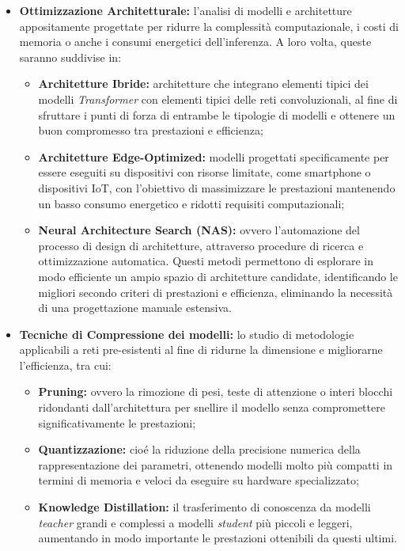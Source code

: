 \begin{itemize}
    \item \textbf{Ottimizzazione Architetturale:} l'analisi di modelli e architetture appositamente progettate per ridurre la complessità computazionale, i costi di memoria o anche i consumi energetici dell'inferenza. A loro volta, queste saranno suddivise in:
          \begin{itemize}
              \item \textbf{Architetture Ibride:} architetture che integrano elementi tipici dei modelli \textit{Transformer} con elementi tipici delle reti convoluzionali, al fine di sfruttare i punti di forza di entrambe le tipologie di modelli e ottenere un buon compromesso tra prestazioni e efficienza;
              \item \textbf{Architetture Edge-Optimized:} modelli progettati specificamente per essere eseguiti su dispositivi con risorse limitate, come smartphone o dispositivi IoT, con l'obiettivo di massimizzare le prestazioni mantenendo un basso consumo energetico e ridotti requisiti computazionali;
              \item \textbf{Neural Architecture Search (NAS):} ovvero l'automazione del processo di design di architetture, attraverso procedure di ricerca e ottimizzazione automatica. Questi metodi permettono di esplorare in modo efficiente un ampio spazio di architetture candidate, identificando le migliori secondo criteri di prestazioni e efficienza, eliminando la necessità di una progettazione manuale estensiva.
          \end{itemize}
    \item \textbf{Tecniche di Compressione dei modelli:} lo studio di metodologie applicabili a reti pre-esistenti al fine di ridurne la dimensione e migliorarne l'efficienza, tra cui:
          \begin{itemize}
              \item \textbf{Pruning:} ovvero la rimozione di pesi, teste di attenzione o interi blocchi ridondanti dall'architettura per snellire il modello senza compromettere significativamente le prestazioni;
              \item \textbf{Quantizzazione:} cioé la riduzione della precisione numerica della rappresentazione dei parametri, ottenendo modelli molto più compatti in termini di memoria e veloci da eseguire su hardware specializzato;
              \item \textbf{Knowledge Distillation:} il trasferimento di conoscenza da modelli \textit{teacher} grandi e complessi a modelli \textit{student} più piccoli e leggeri, aumentando in modo importante le prestazioni ottenibili da questi ultimi.
          \end{itemize}
\end{itemize}
